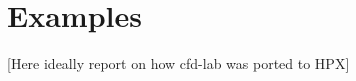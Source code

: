 
\section{Examples} \label{sec:examples}
[\TODO Here ideally report on how cfd-lab was ported to HPX]

